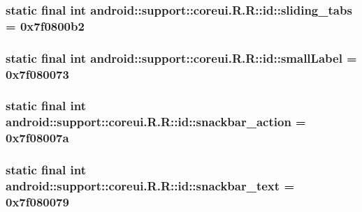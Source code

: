 \hypertarget{classandroid_1_1support_1_1coreui_1_1_r_1_1id_ff70ad22daef2ab030a1a248d3a36ad5}{
\subsubsection[{sliding\_\-tabs}]{\setlength{\rightskip}{0pt plus 5cm}static final int android::support::coreui.R.R::id::sliding\_\-tabs = 0x7f0800b2}}
\label{classandroid_1_1support_1_1coreui_1_1_r_1_1id_ff70ad22daef2ab030a1a248d3a36ad5}


\hypertarget{classandroid_1_1support_1_1coreui_1_1_r_1_1id_a915e5ad88cbb03a9c7edd116dbf05e2}{
\subsubsection[{smallLabel}]{\setlength{\rightskip}{0pt plus 5cm}static final int android::support::coreui.R.R::id::smallLabel = 0x7f080073}}
\label{classandroid_1_1support_1_1coreui_1_1_r_1_1id_a915e5ad88cbb03a9c7edd116dbf05e2}


\hypertarget{classandroid_1_1support_1_1coreui_1_1_r_1_1id_3ec5da0be8512ae0edef3d5a667388cb}{
\subsubsection[{snackbar\_\-action}]{\setlength{\rightskip}{0pt plus 5cm}static final int android::support::coreui.R.R::id::snackbar\_\-action = 0x7f08007a}}
\label{classandroid_1_1support_1_1coreui_1_1_r_1_1id_3ec5da0be8512ae0edef3d5a667388cb}


\hypertarget{classandroid_1_1support_1_1coreui_1_1_r_1_1id_c3a5ed369e74d86bed7c5a3fa4bc58dc}{
\subsubsection[{snackbar\_\-text}]{\setlength{\rightskip}{0pt plus 5cm}static final int android::support::coreui.R.R::id::snackbar\_\-text = 0x7f080079}}
\label{classandroid_1_1support_1_1coreui_1_1_r_1_1id_c3a5ed369e74d86bed7c5a3fa4bc58dc}


